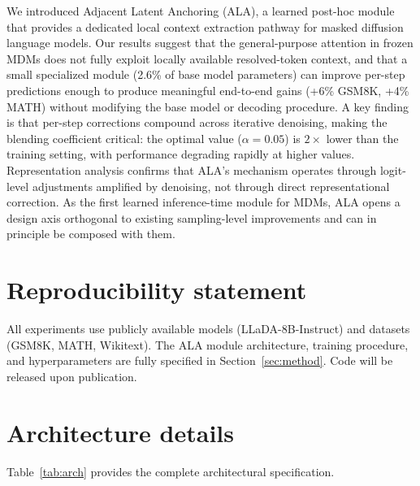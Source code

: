 \documentclass{article} %
\begin{document}
We introduced Adjacent Latent Anchoring (ALA), a learned post-hoc module that provides a dedicated local context extraction pathway for masked diffusion language models.
Our results suggest that the general-purpose attention in frozen MDMs does not fully exploit locally available resolved-token context, and that a small specialized module (2.6\% of base model parameters) can improve per-step predictions enough to produce meaningful end-to-end gains (+6\% GSM8K, +4\% MATH) without modifying the base model or decoding procedure.
A key finding is that per-step corrections compound across iterative denoising, making the blending coefficient critical: the optimal value ($\alpha{=}0.05$) is $2\times$ lower than the training setting, with performance degrading rapidly at higher values.
Representation analysis confirms that ALA's mechanism operates through logit-level adjustments amplified by denoising, not through direct representational correction.
As the first learned inference-time module for MDMs, ALA opens a design axis orthogonal to existing sampling-level improvements and can in principle be composed with them.


\section*{Reproducibility statement}

All experiments use publicly available models (LLaDA-8B-Instruct) and datasets (GSM8K, MATH, Wikitext).
The ALA module architecture, training procedure, and hyperparameters are fully specified in Section~\ref{sec:method}.
Code will be released upon publication.





\appendix

\section{Architecture details}
\label{app:arch}

Table~\ref{tab:arch} provides the complete architectural specification.
\end{document}
